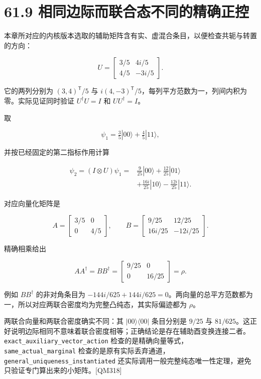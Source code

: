 \documentclass[
  11pt,
  oneside]{book}
\begin{document}
\section{61.9 相同边际而联合态不同的精确正控}

本章所对应的内核版本选取的辅助矩阵含有实、虚混合条目，以便检查共轭与转置的方向：

\[
U=\begin{bmatrix}3/5&4i/5\\4/5&-3i/5\end{bmatrix}.
\]

它的两列分别为 \((3,4)^\mathsf T/5\) 与
\(i(4,-3)^\mathsf T/5\)，每列平方范数为一，列间内积为零。实际见证同时验证
\(U^\dagger U=I\) 和 \(UU^\dagger=I\)。

取

\[
\psi_1=\tfrac35|00\rangle+\tfrac45|11\rangle,
\]

并按已经固定的第二指标作用计算

\[
\begin{aligned}
\psi_2=(I\otimes U)\psi_1
={}&\tfrac9{25}|00\rangle+\tfrac{12}{25}|01\rangle\\
&+\tfrac{16i}{25}|10\rangle-\tfrac{12i}{25}|11\rangle.
\end{aligned}
\]

对应向量化矩阵是

\[
A=\begin{bmatrix}3/5&0\\0&4/5\end{bmatrix},
\qquad
B=\begin{bmatrix}9/25&12/25\\16i/25&-12i/25\end{bmatrix}.
\]

精确相乘给出

\[
AA^\dagger=BB^\dagger
=\begin{bmatrix}9/25&0\\0&16/25\end{bmatrix}=\rho.
\]

例如 \(BB^\dagger\) 的非对角条目为
\(-144i/625+144i/625=0\)。两向量的总平方范数都为一，所以对应两联合密度均为完整凸纯态，其实际偏迹都为
\(\rho\)。

两联合向量和两联合密度确实不同：其 \(|00\rangle\langle00|\) 条目分别是
\(9/25\) 与
\(81/625\)。这正好说明边际相同不意味着联合密度相等；正确结论是存在辅助酉变换连接二者。\texttt{exact\_\allowbreak auxiliary\_\allowbreak vector\_\allowbreak action}
检查的是精确向量等式，\texttt{same\_\allowbreak actual\_\allowbreak marginal}
检查的是原有实际丢弃通道，\texttt{general\_\allowbreak uniqueness\_\allowbreak instantiated}
还实际调用一般完整纯态唯一性定理，避免只验证专门算出来的小矩阵。{[}QM318{]}
\end{document}
